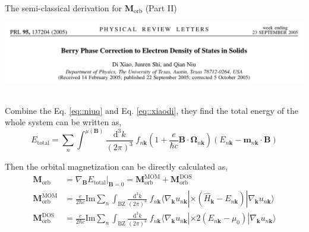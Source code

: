 \documentclass{beamer}
\begin{document}
    \begin{frame}{The semi-classical derivation for \(\bm{M}_{\text{orb}}\) (Part II)}\small
      \begin{tcolorbox}[beamer,width=\textwidth,arc=0pt,boxsep=0.3pt,left=0pt,right=0pt,top=0pt,bottom=0pt]
        \includegraphics[width=\textwidth]{figure/classical-Morb.png}
      \end{tcolorbox}
      \ \\
      
      Combine the Eq. \eqref{eq::niuq} and Eq. \eqref{eq::xiaodi}, they find the total energy of the whole system can be written as, 
      \begin{equation}
        E_{\text{total}} = \sum_n\int^{\mu(\bm{B})}\frac{\mathrm{d}^3k}{(2\pi)^3}\; f_{n\bm{k}}\left(1 + \frac{e}{\hbar{}c}\bm{B}\cdot\bm{\Omega}_{n\bm{k}}\right)(E_{n\bm{k}}-\bm{m}_{n\bm{k}}\cdot\bm{B})
      \end{equation}
      
      Then the orbital magnetization can be directly calculated as, 
      \begin{subequations}
        \begin{align}
          \bm{M}_{\text{orb}} &= \nabla_{\bm{B}}E_{\text{total}} |_{\bm{B}=0} = \bm{M}_{\text{orb}}^{\text{MOM}} + \bm{M}_{\text{orb}}^{\text{DOS}}\\
          \bm{M}_{\text{orb}}^{\text{MOM}} &= \frac{e}{2\hbar{}c}\text{Im}\sum_n\int_{\text{BZ}}\frac{\mathrm{d}^3k}{(2\pi)^3}\; f_{n\bm{k}}\langle\nabla_{\bm{k}}u_{n\bm{k}}|\times(\widehat{H}_{\bm{k}}-E_{n\bm{k}})|\nabla_{\bm{k}}u_{n\bm{k}}\rangle\\
          \bm{M}_{\text{orb}}^{\text{DOS}} &= \frac{e}{2\hbar{}c}\text{Im}\sum_n\int_{\text{BZ}}\frac{\mathrm{d}^3k}{(2\pi)^3}\; f_{n\bm{k}}\langle\nabla_{\bm{k}}u_{n\bm{k}}|\times{}2(E_{n\bm{k}}-\mu_{0})|\nabla_{\bm{k}}u_{n\bm{k}}\rangle
        \end{align}
      \end{subequations}
    \end{frame}
\end{document}
